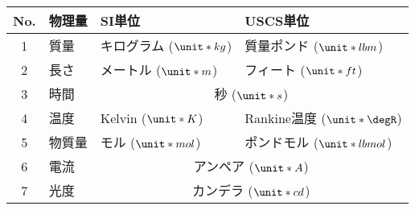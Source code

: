 \begin{tabular}{clll}
\index{SIたんい@SI単位}%
 No. & 物理量 & SI単位 & USCS単位 \\
 \hline
 1 & 質量 & キログラム ($\unit*{kg}$) & 質量ポンド ($\unit*{lbm}$) \\
 2 & 長さ & メートル ($\unit*{m}$) & フィート ($\unit*{ft}$) \\
 3 & 時間 & \multicolumn{2}{c}{秒 ($\unit*{s}$)} \\
 4 & 温度 & Kelvin ($\unit*{K}$) & Rankine温度 ($\unit*{\degR}$) \\
 5 & 物質量 & モル ($\unit*{mol}$)\footnotemark & ポンドモル ($\unit*{lbmol}$) \\
 6 & 電流 & \multicolumn{2}{c}{アンペア ($\unit*{A}$)} \\
 7 & 光度 & \multicolumn{2}{c}{カンデラ ($\unit*{cd}$)} \\
 \hline
\end{tabular}
